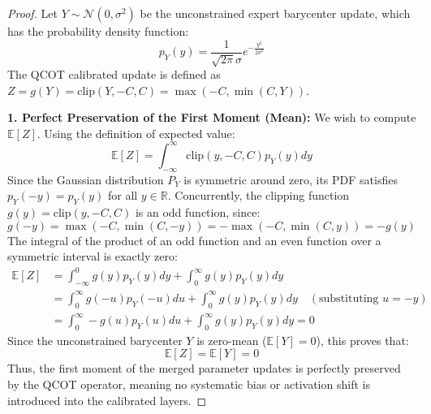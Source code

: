 \documentclass{article}
\theoremstyle{plain}
\theoremstyle{definition}
\theoremstyle{remark}
\begin{document}
\begin{proof}
Let $Y \sim \mathcal{N}(0, \sigma^2)$ be the unconstrained expert barycenter update, which has the probability density function:
\begin{equation}
    p_Y(y) = \frac{1}{\sqrt{2\pi}\sigma} e^{-\frac{y^2}{2\sigma^2}}
\end{equation}
The QCOT calibrated update is defined as $Z = g(Y) = \text{clip}(Y, -C, C) = \max(-C, \min(C, Y))$.

\textbf{1. Perfect Preservation of the First Moment (Mean):}
We wish to compute $\mathbb{E}[Z]$. Using the definition of expected value:
\begin{equation}
    \mathbb{E}[Z] = \int_{-\infty}^{\infty} \text{clip}(y, -C, C) p_Y(y) dy
\end{equation}
Since the Gaussian distribution $P_Y$ is symmetric around zero, its PDF satisfies $p_Y(-y) = p_Y(y)$ for all $y \in \mathbb{R}$. Concurrently, the clipping function $g(y) = \text{clip}(y, -C, C)$ is an odd function, since:
\begin{equation}
    g(-y) = \max(-C, \min(C, -y)) = -\max(-C, \min(C, y)) = -g(y)
\end{equation}
The integral of the product of an odd function and an even function over a symmetric interval is exactly zero:
\begin{align}
    \mathbb{E}[Z] &= \int_{-\infty}^{0} g(y) p_Y(y) dy + \int_{0}^{\infty} g(y) p_Y(y) dy \nonumber \\
    &= \int_{0}^{\infty} g(-u) p_Y(-u) du + \int_{0}^{\infty} g(y) p_Y(y) dy \quad (\text{substituting } u = -y) \nonumber \\
    &= \int_{0}^{\infty} -g(u) p_Y(u) du + \int_{0}^{\infty} g(y) p_Y(y) dy = 0
\end{align}
Since the unconstrained barycenter $Y$ is zero-mean ($\mathbb{E}[Y] = 0$), this proves that:
\begin{equation}
    \mathbb{E}[Z] = \mathbb{E}[Y] = 0
\end{equation}
Thus, the first moment of the merged parameter updates is perfectly preserved by the QCOT operator, meaning no systematic bias or activation shift is introduced into the calibrated layers.


\end{proof}
\end{document}

